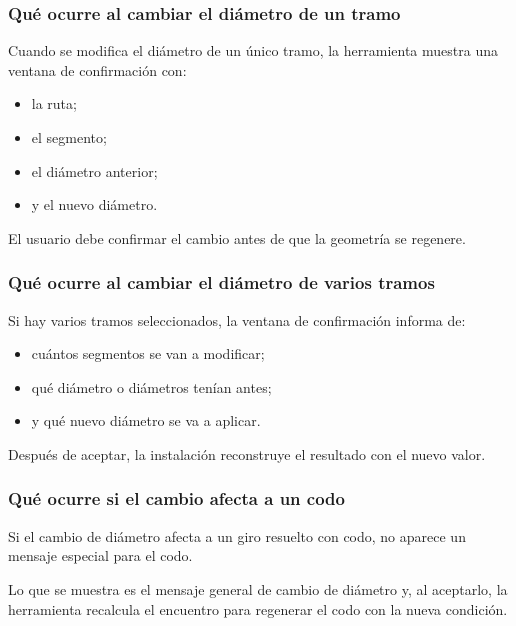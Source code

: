 \subsubsection{Qué ocurre al cambiar el diámetro de un tramo}

Cuando se modifica el diámetro de un único tramo, la herramienta muestra una ventana de confirmación con:

\begin{itemize}
\item la ruta;
\item el segmento;
\item el diámetro anterior;
\item y el nuevo diámetro.
\end{itemize}

El usuario debe confirmar el cambio antes de que la geometría se regenere.


\subsubsection{Qué ocurre al cambiar el diámetro de varios tramos}

Si hay varios tramos seleccionados, la ventana de confirmación informa de:

\begin{itemize}
\item cuántos segmentos se van a modificar;
\item qué diámetro o diámetros tenían antes;
\item y qué nuevo diámetro se va a aplicar.
\end{itemize}

Después de aceptar, la instalación reconstruye el resultado con el nuevo valor.


\subsubsection{Qué ocurre si el cambio afecta a un codo}

Si el cambio de diámetro afecta a un giro resuelto con codo, no aparece un mensaje especial para el codo.

Lo que se muestra es el mensaje general de cambio de diámetro y, al aceptarlo, la herramienta recalcula el encuentro para regenerar el codo con la nueva condición.


